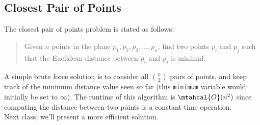\subsection{Closest Pair of Points}

The closest pair of points problem is stated as follows:

\begin{quote}
    Given $n$ points in the plane $p_1, p_2, p_3, \ldots, p_n$, find two points $p_i$ and $p_j$ such that the Euclidean distance between $p_i$ and $p_j$ is minimal. 
\end{quote}

A simple brute force solution is to consider all ${n\choose 2}$ pairs of points, and keep track of the minimum distance value seen so far (this \verb!minimum! variable would initially be set to $\infty$). The runtime of this algorithm is $\mtahcal{O}(n^2)$ since computing the distance between two points is a constant-time operation. \\

Next class, we'll present a more efficient solution. 